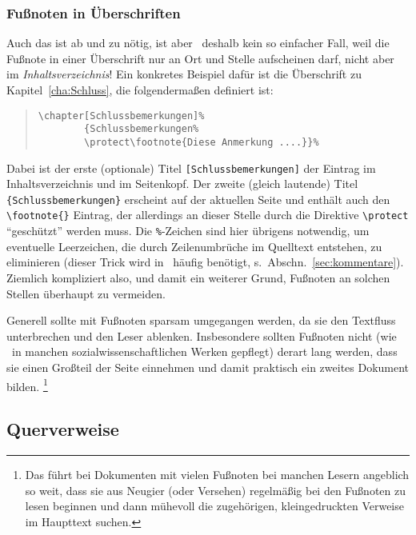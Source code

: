 \subsubsection{Fußnoten in Überschriften}

Auch das ist ab und zu nötig, ist aber \va\ deshalb kein so
einfacher Fall, weil die Fußnote in einer Überschrift nur an Ort
und Stelle aufscheinen darf, nicht aber im \emph{Inhaltsverzeichnis}! Ein
konkretes Beispiel dafür ist die Überschrift zu
Kapitel~\ref{cha:Schluss}, die folgendermaßen definiert ist:
%
\begin{quote}
\begin{verbatim}
\chapter[Schlussbemerkungen]%
        {Schlussbemerkungen%
        \protect\footnote{Diese Anmerkung ....}}%
\end{verbatim}
\end{quote}
%
Dabei ist der erste (optionale) Titel \verb![Schlussbemerkungen]!
der Eintrag im Inhaltsverzeichnis und im Seitenkopf. 
Der zweite (gleich lautende) Titel
\texttt{\{Schlussbemerkungen\}} erscheint auf der aktuellen Seite und
enthält auch den \verb!\footnote{}! Eintrag, der allerdings an
dieser Stelle durch die Direktive \verb!\protect! "`geschützt"'
werden muss. Die \verb!%!-Zeichen sind hier übrigens notwendig,
um eventuelle Leerzeichen, die durch Zeilenumbrüche im Quelltext
entstehen, zu eliminieren (dieser Trick wird 
in \latex\ häufig benötigt, s.\ Abschn.~\ref{sec:kommentare}). 
Ziemlich kompliziert also, und damit 
ein weiterer Grund, Fußnoten an solchen Stellen überhaupt zu vermeiden.

Generell sollte mit Fußnoten sparsam umgegangen werden, da sie den
Textfluss unterbrechen und den Leser ablenken. Insbesondere
sollten Fußnoten nicht (wie \va\ in manchen
sozialwissenschaftlichen Werken gepflegt) derart lang werden, dass
sie einen Großteil der Seite einnehmen und damit praktisch ein
zweites Dokument bilden.%
\footnote{Das führt bei Dokumenten mit vielen Fußnoten bei manchen Lesern angeblich so weit, dass sie aus Neugier (oder Versehen) regelmäßig bei den Fußnoten zu lesen beginnen und dann mühevoll die zugehörigen, kleingedruckten Verweise im Haupttext suchen.}


\subsection{Querverweise}
\label{sec:querverweise}

